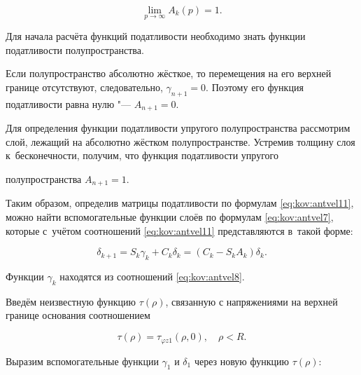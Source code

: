 \begin{equation}

\lim_{p\to \infty}A_{k}(p)=1 .

\label{eq:kov:antvel12}

\end{equation}

Для начала расчёта функций податливости необходимо знать функции податливости полупространства. 

Если полупространство абсолютно жёсткое, то перемещения на его верхней границе отсутствуют, следовательно, $\gamma_{n+1}=0$. Поэтому его функция податливости равна нулю "--- $A_{n+1}=0$. 

Для определения функции податливости упругого полупространства рассмотрим слой, лежащий на абсолютно жёстком полупространстве. Устремив толщину слоя к~бесконечности, получим, что функция податливости упругого

полупространства $A_{n+1}=1$. 

Таким образом, определив матрицы податливости по формулам \eqref{eq:kov:antvel11}, можно найти вспомогательные функции слоёв по формулам \eqref{eq:kov:antvel7}, которые с~учётом соотношений \eqref{eq:kov:antvel11} представляются в~такой форме:

\begin{equation*}

\delta_{k+1}=S_{k}\gamma_{k}+C_{k}\delta_{k}=(C_{k}-S_{k}A_{k})\delta_{k}.

\end{equation*}

Функции $\gamma_{k}$ находятся из соотношений \eqref{eq:kov:antvel8}.



\smallskip




Введём неизвестную функцию $\tau(\rho)$, связанную с напряжениями на верхней границе основания соотношением

\begin{equation*}

\tau(\rho)=\tau_{\varphi z1}(\rho, 0), \quad  \rho<R.

\end{equation*}

Выразим вспомогательные функции $\gamma_{1}$ и $\delta_{1}$ через новую функцию $\tau(\rho)$:

